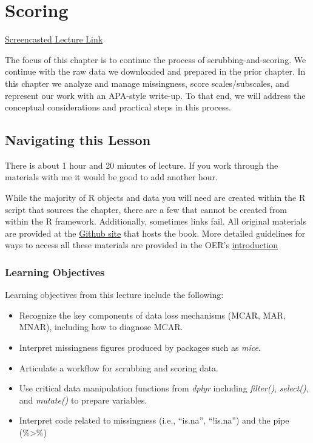 \documentclass[
]{book}
\providecommand{\tightlist}{%
  \setlength{\itemsep}{0pt}\setlength{\parskip}{0pt}}
\begin{document}
\hypertarget{score}{%
\chapter{Scoring}\label{score}}

\href{https://spu.hosted.panopto.com/Panopto/Pages/Viewer.aspx?pid=18a6be07-5bdc-404d-bc95-acf601830887}{Screencasted Lecture Link}

The focus of this chapter is to continue the process of scrubbing-and-scoring. We continue with the raw data we downloaded and prepared in the prior chapter. In this chapter we analyze and manage missingness, score scales/subscales, and represent our work with an APA-style write-up. To that end, we will address the conceptual considerations and practical steps in this process.

\hypertarget{navigating-this-lesson-1}{%
\section{Navigating this Lesson}\label{navigating-this-lesson-1}}

There is about 1 hour and 20 minutes of lecture. If you work through the materials with me it would be good to add another hour.

While the majority of R objects and data you will need are created within the R script that sources the chapter, there are a few that cannot be created from within the R framework. Additionally, sometimes links fail. All original materials are provided at the \href{https://github.com/lhbikos/ReC_MultivModel}{Github site} that hosts the book. More detailed guidelines for ways to access all these materials are provided in the OER's \protect\hyperlink{ReCintro}{introduction}

\hypertarget{learning-objectives-1}{%
\subsection{Learning Objectives}\label{learning-objectives-1}}

Learning objectives from this lecture include the following:

\begin{itemize}
\tightlist
\item
  Recognize the key components of data loss mechanisms (MCAR, MAR, MNAR), including how to diagnose MCAR.
\item
  Interpret missingness figures produced by packages such as \emph{mice}.
\item
  Articulate a workflow for scrubbing and scoring data.
\item
  Use critical data manipulation functions from \emph{dplyr} including \emph{filter()}, \emph{select()}, and \emph{mutate()} to prepare variables.
\item
  Interpret code related to missingness (i.e., ``is.na'', ``!is.na'') and the pipe (\%\textgreater\%)
\end{itemize}
\end{document}
